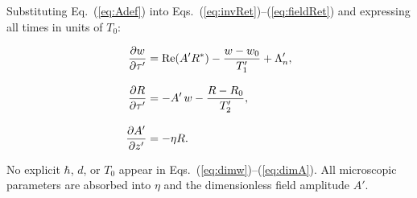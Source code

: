 \documentclass[12pt,a4paper]{article}
\newcommand{\T}{T_0}
\begin{document}
Substituting Eq.~(\ref{eq:Adef}) into
Eqs.~(\ref{eq:invRet})--(\ref{eq:fieldRet}) and expressing all times in
units of $\T$:

\begin{resultbox}
\begin{align}
  \dfrac{\partial w}{\partial \tau'}
    &= \operatorname{Re}(A'R^*)
       - \frac{w - w_0}{T_1'}
       + \Lambda_n',
  \label{eq:dimw}\\[8pt]
  \dfrac{\partial R}{\partial \tau'}
    &= -A'\,w - \frac{R-R_0}{T_2'},
  \label{eq:dimR}\\[8pt]
  \dfrac{\partial A'}{\partial z'}
    &= -\eta R.
  \label{eq:dimA}
\end{align}
\end{resultbox}

\begin{notebox}
  No explicit $\hbar$, $d$, or $\T$ appear in
  Eqs.~(\ref{eq:dimw})--(\ref{eq:dimA}).
  All microscopic parameters are absorbed into $\eta$
  and the dimensionless field amplitude $A'$.
\end{notebox}
\end{document}
